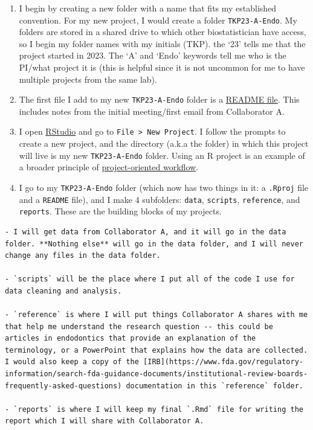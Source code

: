 \documentclass[
]{book}
\begin{document}
\begin{enumerate}
\def\labelenumi{\arabic{enumi}.}
\item
  I begin by creating a new folder with a name that fits my established convention. For my new project, I would create a folder \texttt{TKP23-A-Endo}. My folders are stored in a shared drive to which other biostatistician have access, so I begin my folder names with my initials (TKP). the `23' tells me that the project started in 2023. The `A' and `Endo' keywords tell me who is the PI/what project it is (this is helpful since it is not uncommon for me to have multiple projects from the same lab).
\item
  The first file I add to my new \texttt{TKP23-A-Endo} folder is a \protect\hyperlink{readme}{README file}. This includes notes from the initial meeting/first email from Collaborator A.
\item
  I open \href{https://posit.co/download/rstudio-desktop/}{RStudio} and go to \texttt{File\ \textgreater{}\ New\ Project}. I follow the prompts to create a new project, and the directory (a.k.a the folder) in which this project will live is my new \texttt{TKP23-A-Endo} folder. Using an R project is an example of a broader principle of \href{https://www.tidyverse.org/blog/2017/12/workflow-vs-script/}{project-oriented workflow}.
\item
  I go to my \texttt{TKP23-A-Endo} folder (which now has two things in it: a \texttt{.Rproj} file and a \texttt{README} file), and I make 4 subfolders: \texttt{data}, \texttt{scripts}, \texttt{reference}, and \texttt{reports}. These are the building blocks of my projects.
\end{enumerate}

\begin{verbatim}
- I will get data from Collaborator A, and it will go in the data folder. **Nothing else** will go in the data folder, and I will never change any files in the data folder.   

- `scripts` will be the place where I put all of the code I use for data cleaning and analysis. 

- `reference` is where I will put things Collaborator A shares with me that help me understand the research question -- this could be articles in endodontics that provide an explanation of the terminology, or a PowerPoint that explains how the data are collected. I would also keep a copy of the [IRB](https://www.fda.gov/regulatory-information/search-fda-guidance-documents/institutional-review-boards-frequently-asked-questions) documentation in this `reference` folder.  

- `reports` is where I will keep my final `.Rmd` file for writing the report which I will share with Collaborator A. 
\end{verbatim}
\end{document}
